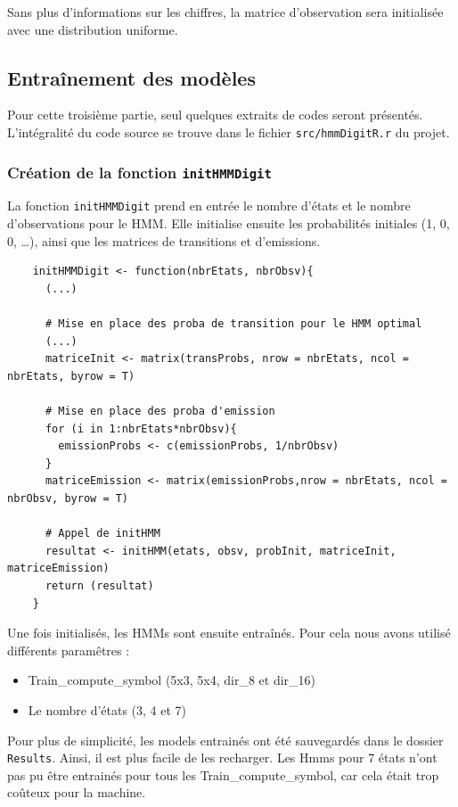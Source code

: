 Sans plus d'informations sur les chiffres, la matrice d'observation sera initialisée avec une distribution uniforme.


\subsection{Entraînement des modèles}

Pour cette troisième partie, seul quelques extraits de codes seront présentés. L'intégralité du code source se trouve dans le fichier \texttt{src/hmmDigitR.r} du projet. 

\subsubsection*{Création de la fonction \texttt{initHMMDigit}}
La fonction \texttt{initHMMDigit} prend en entrée le nombre d'états et le nombre d'observations pour le HMM. Elle initialise ensuite les probabilités initiales (1, 0, 0, \dots), ainsi que les matrices de transitions et d'emissions.\\

\newpage

\begin{lstlisting}
	initHMMDigit <- function(nbrEtats, nbrObsv){
	  (...)
		
	  # Mise en place des proba de transition pour le HMM optimal
	  (...)
	  matriceInit <- matrix(transProbs, nrow = nbrEtats, ncol = nbrEtats, byrow = T)
	  
	  # Mise en place des proba d'emission
	  for (i in 1:nbrEtats*nbrObsv){
		emissionProbs <- c(emissionProbs, 1/nbrObsv)
	  }
	  matriceEmission <- matrix(emissionProbs,nrow = nbrEtats, ncol = nbrObsv, byrow = T)
	  
	  # Appel de initHMM
	  resultat <- initHMM(etats, obsv, probInit, matriceInit, matriceEmission)
	  return (resultat)
	}
\end{lstlisting}

Une fois initialisés, les HMMs sont ensuite entraînés. Pour cela nous avons utilisé différents paramêtres :
\begin{itemize}
	\item Train\_compute\_symbol (5x3, 5x4, dir\_8 et dir\_16)
	\item Le nombre d'états (3, 4 et 7)
\end{itemize}

\vspace{0.5cm}

Pour plus de simplicité, les models entrainés ont été sauvegardés dans le dossier \texttt{Results}. Ainsi, il est plus facile de les recharger. Les Hmms pour 7 états n'ont pas pu être entrainés pour tous les Train\_compute\_symbol, car cela était trop coûteux pour la machine.


